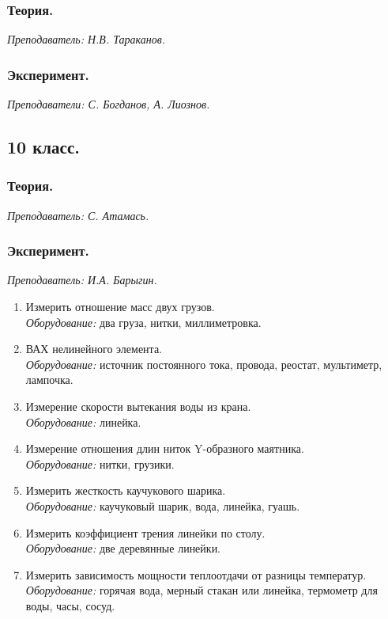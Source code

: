 \documentclass[11pt]{article}
\newlength{\h}
\newlength{\x}
\begin{document}
\subsubsection{Теория.}
\label{sec:th89}

\textit{Преподаватель: Н.В. Тараканов.}

\subsubsection{Эксперимент.}
\label{sec:exp89}

\textit{Преподаватели: С. Богданов, А. Лиознов.}

\subsection{10 класс.}
\label{sec:daily10}

\subsubsection{Теория.}
\label{sec:th10}

\textit{Преподаватель: С. Атамась.}

\subsubsection{Эксперимент.}
\label{sec:exp10}

\textit{Преподаватель: И.А. Барыгин.}\\
\begin{enumerate}
\item Измерить отношение масс двух грузов.\\
  \textit{Оборудование:} два груза, нитки, миллиметровка.
\item ВАХ нелинейного элемента.\\
  \textit{Оборудование:} источник постоянного тока, провода, реостат,
  мультиметр, лампочка.
\item Измерение скорости вытекания воды из крана.\\
  \textit{Оборудование:} линейка.
\item Измерение отношения длин ниток Y-образного маятника.\\
  \textit{Оборудование:} нитки, грузики.
\item Измерить жесткость каучукового шарика.\\
  \textit{Оборудование:} каучуковый шарик, вода, линейка, гуашь.
\item Измерить коэффициент трения линейки по столу.\\
  \textit{Оборудование:} две деревянные линейки.
\item Измерить зависимость мощности теплоотдачи от разницы температур.\\
  \textit{Оборудование:} горячая вода, мерный стакан или линейка,
  термометр для воды, часы, сосуд.
\end{enumerate}
\end{document}
